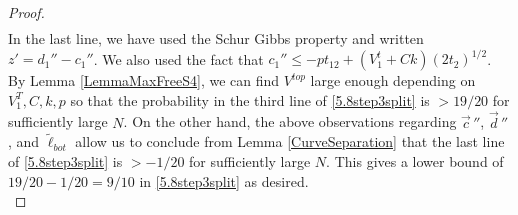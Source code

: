 \begin{proof}
\begin{equation}
\begin{split}
	\end{split}
	\end{equation}
	In the last line, we have used the Schur Gibbs property and written $z' = d_1'' - c_1''$. We also used the fact that $c_1'' \leq -pt_{12} + (V_1^t + Ck)(2t_2)^{1/2}$. By Lemma \ref{LemmaMaxFreeS4}, we can find $V^{top}$ large enough depending on $V_1^T,C,k,p$ so that the probability in the third line of \eqref{5.8step3split} is $>19/20$ for sufficiently large $N$. On the other hand, the above observations regarding $\vec{c}\,''$, $\vec{d}\,''$, and $\tilde{\ell}_{bot}$ allow us to conclude from Lemma \ref{CurveSeparation} that the last line of \eqref{5.8step3split} is $>-1/20$ for sufficiently large $N$. This gives a lower bound of $19/20 - 1/20 = 9/10$ in \eqref{5.8step3split} as desired.\\
	

\end{proof}
